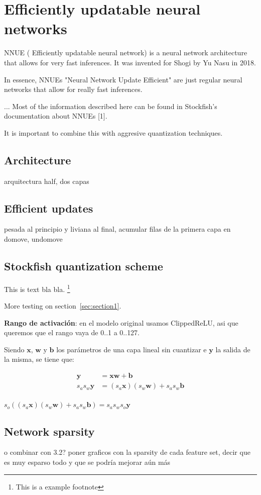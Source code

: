 \section{Efficiently updatable neural networks}

NNUE ( Efficiently updatable neural network) is a neural network architecture that allows for very fast inferences. It was invented for Shogi by Yu Nasu in 2018.

In essence, NNUEs "Neural Network Update Efficient" are just regular neural networks that allow for really fast inferences.

...
Most of the information described here can be found in Stockfish's documentation about NNUEs [1].


It is important to combine this with aggresive quantization techniques.

\subsection{Architecture}


arquitectura half, dos capas


\subsection{Efficient updates}

pesada al principio y liviana al final, acumular filas de la primera capa en domove, undomove

\subsection{Stockfish quantization scheme}

\blindmathtrue
\label{sec:section1}
\blindtext[5]


This is text bla bla. \footnote[2]{This is a example footnote}

More testing on section~\ref{sec:section1}.



\textbf{Rango de activación}: en el modelo original usamos ClippedReLU, asi que queremos que el rango vaya de 0..1 a 0..127.


Siendo $\bm{x}$, $\bm{w}$ y $\bm{b}$ los parámetros de una capa lineal sin cuantizar e $\bm{y}$ la salida de la misma, se tiene que:

\begin{equation}
\begin{aligned}
\bm{y} &= \bm{x} \bm{w} + \bm{b} \\
s_a s_w \bm{y} &= (s_a \bm{x}) (s_w \bm{w}) + s_a s_w \bm{b} \\
\end{aligned}
\end{equation}



\vspace{1cm}
$s_o ((s_a \bm{x}) (s_w \bm{w}) + s_a s_w \bm{b}) = s_a s_w s_o \bm{y}$



\subsection{Network sparsity}

o combinar con 3.2?
poner graficos con la sparsity de cada feature set, decir que es muy esparso todo y que se podría mejorar aún más
